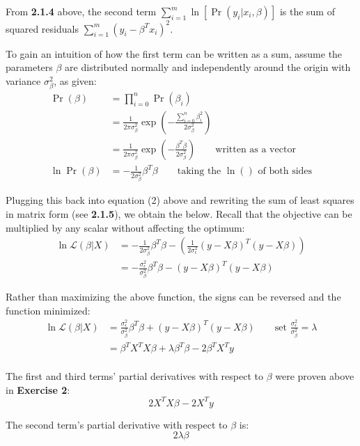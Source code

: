 \documentclass{article}
\begin{document}
	From \textbf{2.1.4} above, the second term $\sum_{i=1}^{m}\ln\left[\Pr(y_i|x_i,\beta)\right]$ is the sum of squared residuals $\sum_{i=1}^{m}(y_i-\beta^Tx_i)^2$.
	
	To gain an intuition of how the first term can be written as a sum, assume the parameters $\beta$ are distributed normally and independently around the origin with variance $\sigma^2_\beta$, as given:
	\begin{align*}
	\Pr(\beta)&=\prod_{i=0}^{n}\Pr(\beta_i)\\
	&=\frac{1}{2\pi\sigma_\beta^2}\exp\left(-\frac{\sum_{i=0}^{n}\beta_i^2}{2\sigma_\beta^2}\right)\\
	&=\frac{1}{2\pi\sigma_\beta^2}\exp\left(-\frac{\beta^T\beta}{2\sigma_\beta^2}\right)\qquad\text{written as a vector}\\
	\ln\Pr(\beta)&=-\frac{1}{2\sigma_\beta^2}\beta^T\beta\qquad\text{taking the $\ln()$ of both sides}
	\end{align*}
	
	Plugging this back into equation (2) above and rewriting the sum of least squares in matrix form (see \textbf{2.1.5}), we obtain the below. Recall that the objective can be multiplied by any scalar without affecting the optimum:
	\begin{align*}
	\ln\mathcal{L}(\beta|X)&=-\frac{1}{2\sigma_\beta^2}\beta^T\beta-\left(\frac{1}{2\sigma_\epsilon^2}(y-X\beta)^{T}(y-X\beta)\right)\\
	&=-\frac{\sigma_\epsilon^2}{\sigma_\beta^2}\beta^T\beta-(y-X\beta)^{T}(y-X\beta)
	\end{align*}
	
	Rather than maximizing the above function, the signs can be reversed and the function minimized:
	\begin{align*}
	\ln\mathcal{L}(\beta|X)&=\frac{\sigma_\epsilon^2}{\sigma_\beta^2}\beta^T\beta+(y-X\beta)^{T}(y-X\beta)\qquad\text{set $\frac{\sigma_\epsilon^2}{\sigma_\beta^2}=\lambda$}\\
	&=\beta^{T}X^TX\beta+\lambda\beta^T\beta-2\beta^TX^Ty\\
	\end{align*}
	
	The first and third terms' partial derivatives with respect to $\beta$  were proven above in \textbf{Exercise 2}:
	\begin{equation*}
	2X^TX\beta-2X^Ty
	\end{equation*}
	
	The second term's partial derivative with respect to $\beta$ is:
	\begin{equation*}
	2\lambda\beta
	\end{equation*}
	
\end{document}
